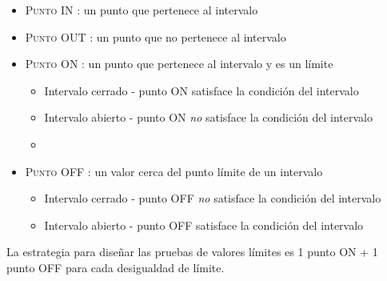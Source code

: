 \begin{itemize}
   \item \textsc{Punto IN} : un punto que pertenece al intervalo
   \item \textsc{Punto OUT} : un punto que no pertenece al intervalo
   \item \textsc{Punto ON} : un punto que pertenece al intervalo y es un límite
   \begin{itemize}
      \item Intervalo cerrado - punto ON satisface la
      condición del intervalo
      \item Intervalo abierto - punto ON \textit{no} satisface la
      condición del intervalo
      \item {}
   \end{itemize}
   \item \textsc{Punto OFF} : un valor cerca del punto límite de un intervalo
   \begin{itemize}
      \item Intervalo cerrado - punto OFF \textit{no} satisface la
      condición del intervalo
      \item Intervalo abierto - punto OFF satisface la
      condición del intervalo
   \end{itemize}
\end{itemize}

La estrategia para diseñar las pruebas de valores límites es 1 punto ON + 1 punto OFF para cada desigualdad de límite.

